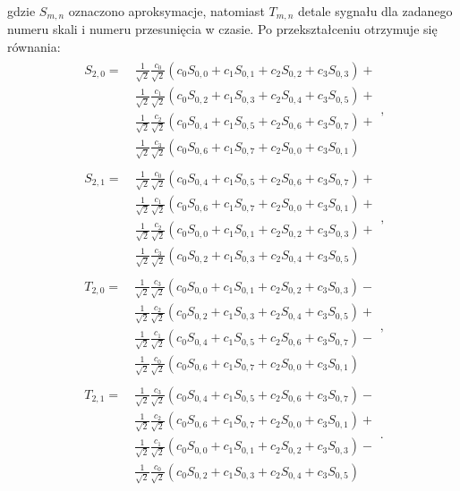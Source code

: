 gdzie $S_{m,n}$ oznaczono aproksymacje, natomiast $T_{m,n}$ detale sygnału dla zadanego numeru skali i numeru przesunięcia w czasie. Po przekształceniu otrzymuje się równania:
\begin{gather}
\begin{split}
S_{2,0}  = ~
	& \frac{1}{\sqrt{2}} \frac{c_0}{\sqrt{2}} \left( c_0 S_{0,0} + c_1 S_{0,1} + c_2 S_{0,2} + c_3 S_{0,3} \right) + \\
	& \frac{1}{\sqrt{2}} \frac{c_1}{\sqrt{2}} \left( c_0 S_{0,2} + c_1 S_{0,3} + c_2 S_{0,4} + c_3 S_{0,5} \right) + \\
	& \frac{1}{\sqrt{2}} \frac{c_2}{\sqrt{2}} \left( c_0 S_{0,4} + c_1 S_{0,5} + c_2 S_{0,6} + c_3 S_{0,7} \right) + \\
	& \frac{1}{\sqrt{2}} \frac{c_3}{\sqrt{2}} \left( c_0 S_{0,6} + c_1 S_{0,7} + c_2 S_{0,0} + c_3 S_{0,1} \right)
\end{split}
\label{eqn_db2_outvect_s_2_0_rek}, \\
\begin{split}
S_{2,1}  = ~
	& \frac{1}{\sqrt{2}} \frac{c_0}{\sqrt{2}} \left( c_0 S_{0,4} + c_1 S_{0,5} + c_2 S_{0,6} + c_3 S_{0,7} \right) + \\
	& \frac{1}{\sqrt{2}} \frac{c_1}{\sqrt{2}} \left( c_0 S_{0,6} + c_1 S_{0,7} + c_2 S_{0,0} + c_3 S_{0,1} \right) + \\
	& \frac{1}{\sqrt{2}} \frac{c_2}{\sqrt{2}} \left( c_0 S_{0,0} + c_1 S_{0,1} + c_2 S_{0,2} + c_3 S_{0,3} \right) + \\
	& \frac{1}{\sqrt{2}} \frac{c_3}{\sqrt{2}} \left( c_0 S_{0,2} + c_1 S_{0,3} + c_2 S_{0,4} + c_3 S_{0,5} \right)
\end{split}
\label{eqn_db2_outvect_s_2_1_rek}, \\
\begin{split}
T_{2,0}  = ~
	& \frac{1}{\sqrt{2}} \frac{c_3}{\sqrt{2}} \left( c_0 S_{0,0} + c_1 S_{0,1} + c_2 S_{0,2} + c_3 S_{0,3} \right) - \\
	& \frac{1}{\sqrt{2}} \frac{c_2}{\sqrt{2}} \left( c_0 S_{0,2} + c_1 S_{0,3} + c_2 S_{0,4} + c_3 S_{0,5} \right) + \\
	& \frac{1}{\sqrt{2}} \frac{c_1}{\sqrt{2}} \left( c_0 S_{0,4} + c_1 S_{0,5} + c_2 S_{0,6} + c_3 S_{0,7} \right) - \\
	& \frac{1}{\sqrt{2}} \frac{c_0}{\sqrt{2}} \left( c_0 S_{0,6} + c_1 S_{0,7} + c_2 S_{0,0} + c_3 S_{0,1} \right)
\end{split}
\label{eqn_db2_outvect_t_2_0_rek}, \\
\begin{split}
T_{2,1}  = ~
	& \frac{1}{\sqrt{2}} \frac{c_3}{\sqrt{2}} \left( c_0 S_{0,4} + c_1 S_{0,5} + c_2 S_{0,6} + c_3 S_{0,7} \right) - \\
	& \frac{1}{\sqrt{2}} \frac{c_2}{\sqrt{2}} \left( c_0 S_{0,6} + c_1 S_{0,7} + c_2 S_{0,0} + c_3 S_{0,1} \right) + \\
	& \frac{1}{\sqrt{2}} \frac{c_1}{\sqrt{2}} \left( c_0 S_{0,0} + c_1 S_{0,1} + c_2 S_{0,2} + c_3 S_{0,3} \right) - \\
	& \frac{1}{\sqrt{2}} \frac{c_0}{\sqrt{2}} \left( c_0 S_{0,2} + c_1 S_{0,3} + c_2 S_{0,4} + c_3 S_{0,5} \right)
\end{split}
\label{eqn_db2_outvect_t_2_1_rek}.
\end{gather}
